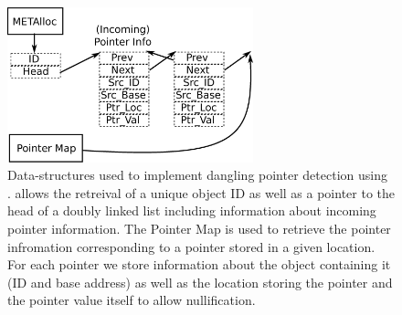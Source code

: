 \begin{figure}[t]
\center
  \includegraphics[width=2.8in]{figs/metasentry.eps}
  \caption{
  Data-structures used to implement dangling pointer detection using \projectname{}.
  \projectname{} allows the retreival of a unique object ID as well as a pointer to the head
  of a doubly linked list including information about incoming pointer information. The Pointer Map
  is used to retrieve the pointer infromation corresponding to a pointer stored in a given location.
  For each pointer we store information about the object containing it (ID and base address) as well
  as the location storing the pointer and the pointer value itself to allow nullification.
  }
  \label{fig:metasentry}
  \vspace{-1em}
\end{figure}
